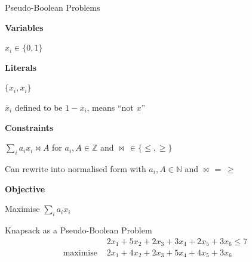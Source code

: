 \documentclass[aspectratio=169,compress,10pt]{beamer}
\begin{document}
\begin{frame}{Pseudo-Boolean Problems}
    \begin{minipage}[t]{0.25\framewidth}
        \textcolor{uofgcobalt}{\textbf{Variables}}
    \end{minipage}\hfill\begin{minipage}[c]{0.70\framewidth}
        $x_i \in \{ 0, 1 \}$
    \end{minipage}\bigskip

    \begin{minipage}[t]{0.25\framewidth}
        \textcolor{uofgcobalt}{\textbf{Literals}}
    \end{minipage}\hfill\begin{minipage}[c]{0.70\framewidth}
        $\{ x_i, \overline{x}_i \}$

        \medskip

        $\overline{x}_i$ defined to be $1 - x_i$, means ``not $x$''
    \end{minipage}\bigskip

    \begin{minipage}[t]{0.25\framewidth}
        \textcolor{uofgcobalt}{\textbf{Constraints}}
    \end{minipage}\hfill\begin{minipage}[c]{0.70\framewidth}
        $\sum_i a_i x_i \bowtie A$ for $a_i, A \in \mathbb{Z}$ and $\bowtie \,\in \{ \le, \ge \}$

        \medskip
        Can rewrite into normalised form with $a_i, A \in \mathbb{N}$ and $\bowtie\,=\,\ge$
    \end{minipage}\bigskip

    \begin{minipage}[t]{0.25\framewidth}
        \textcolor{uofgcobalt}{\textbf{Objective}}
    \end{minipage}\hfill\begin{minipage}[c]{0.70\framewidth}
        Maximise $\sum_i a_i x_i$
    \end{minipage}\bigskip
\end{frame}

\begin{frame}{Knapsack as a Pseudo-Boolean Problem}
    \begin{align*}
        &2 x_1 + 5 x_2 + 2 x_3 + 3 x_4 + 2 x_5 + 3 x_6 \le 7 \\
        \text{maximise~} &2 x_1 + 4 x_2 + 2 x_3 + 5 x_4 + 4 x_5 + 3 x_6
    \end{align*}
\end{frame}
\end{document}
